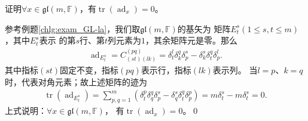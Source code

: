 \begin{example}
    证明$\forall x\in \mathfrak{gl}(m,\mathbb{F})$，有$\operatorname{tr}(\operatorname{ad}_{x})=0$。
\end{example}
参考例题\ref{chlg:exam_GL-la}，我们取$\mathfrak{gl}(m,\mathbb{F})$的基矢为
矩阵$E^s_{t}(1\leqslant s,t \leqslant m)$，其中$E^s_{t}$表示
的第$s$行、第$t$列元素为$1$，其余矩阵元是零。那么
\begin{align*}
    \operatorname{ad}_{E^s_{t}}=C^{(pq)}_{(st)(lk)}
    = \delta^l_{t} \delta^q_{k} \delta^s_{p}
    -\delta^s_{k} \delta^q_{t} \delta^l_{p}.
\end{align*}
其中指标$(st)$固定不变，指标$(pq)$表示行，指标$(lk)$表示列。
当$l=p$、$k=q$时，代表对角元素；故上述矩阵的迹为
\begin{align*}
    \operatorname{tr}\left( \operatorname{ad}_{E^s_{t}} \right)=
    \sum_{p,q=1}^{m}\left(\delta^p_{t} \delta^q_{q} \delta^s_{p}
    -\delta^s_{q} \delta^q_{t} \delta^p_{p} \right)
    = m \delta^s_{t}- m \delta^s_{t}=0.
\end{align*}
上式说明：$\forall x\in \mathfrak{gl}(m,\mathbb{F})$，
有$\operatorname{tr}(\operatorname{ad}_{x})=0$。\qed

